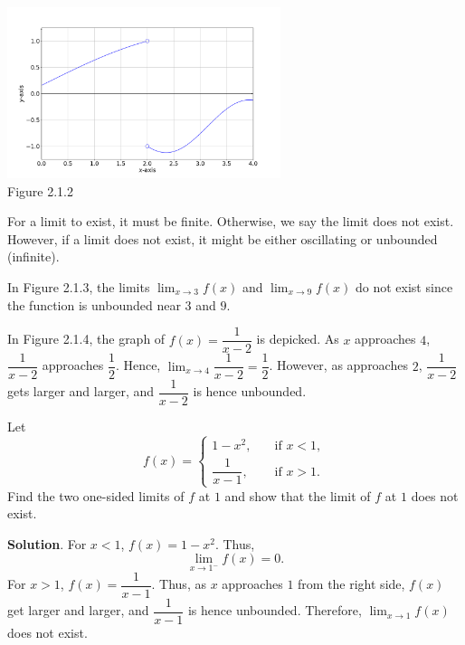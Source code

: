 \documentclass[11pt]{book}
\theoremstyle{break}
\theoremstyle{no_label}
\newcommand{\figtag}[1]{\\[-1.2em]Figure {#1}}
\numberwithin{equation}{section}
\begin{document}
\begin{center}
    \includegraphics[width=0.6\textwidth]{jumpy.png}\figtag{2.1.2}
\end{center}

\begin{remark}
    For a limit to exist, it must be finite. Otherwise, we say the limit does not exist. However, if a limit does not exist, it might be either oscillating or unbounded (infinite).
\end{remark}

\begin{example}
    In Figure 2.1.3, the limits $\displaystyle\lim_{x\to 3} f(x)$ and $\displaystyle\lim_{x\to 9} f(x)$ do not exist since the function is unbounded near $3$ and $9$.
\end{example}

\begin{example}
    In Figure 2.1.4, the graph of $f(x)=\dfrac{1}{x-2}$ is depicked. As $x$ approaches $4$, $\dfrac{1}{x-2}$ approaches $\dfrac{1}{2}$. Hence, $\displaystyle\lim_{x\to 4}\dfrac{1}{x-2}=\dfrac{1}{2}$. However, as approaches $2$, $\dfrac{1}{x-2}$ gets larger and larger, and $\dfrac{1}{x-2}$ is hence unbounded.
\end{example}

\begin{example}
    Let $$f(x)=\left\{\begin{array}{rl}
        1-x^2, \quad & \text{if $x<1$},\\\dfrac{1}{x-1}, \quad & \text{if $x>1$}.
    \end{array}\right.$$ Find the two one-sided limits of $f$ at $1$ and show that the limit of $f$ at $1$ does not exist.
\end{example}
\textbf{Solution}. For $x<1$, $f(x)=1-x^2$. Thus, $$\lim_{x\to1^-}f(x)=0.$$ For $x>1$, $f(x)=\dfrac{1}{x-1}$. Thus, as $x$ approaches $1$ from the right side, $f(x)$ get larger and larger, and $\dfrac{1}{x-1}$ is hence unbounded. Therefore, $\displaystyle\lim_{x\to 1}f(x)$ does not exist.
\end{document}
